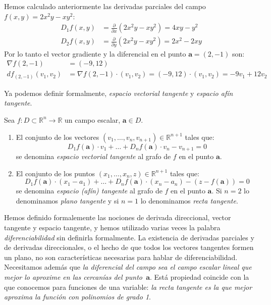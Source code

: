 \begin{ejemplo}
Hemos calculado anteriormente las derivadas parciales del campo 
$f(x,y)=2x^2y-xy^2$:
\begin{align*}
D_1f(x,y)&=\frac{\partial}{\partial x} (2x^2y-xy^2) = 4xy-y^2\\
D_2f(x,y)&=\frac{\partial}{\partial y} (2x^2y-xy^2) = 2x^2-2xy
\end{align*}
Por lo tanto el vector gradiente y la diferencial en el punto $\boldsymbol a=(2,-1)$ son:
\begin{align*}
\nabla f(2,-1)&=(-9,12)\\
df_{(2,-1)}(v_1,v_2)&=\nabla f(2,-1)\cdot(v_1,v_2)=(-9,12)\cdot(v_1,v_2)=
-9v_1+12v_2\tag*{\fej}
\end{align*}
\end{ejemplo}

Ya podemos definir formalmente, \emph{espacio vectorial tangente} y  \emph{espacio afín tangente}.
%
\begin{definicion}\label{def:tang}
Sea $f\colon \mathit{D}\subset \mathbb{R}^n\to \mathbb{R}$ un campo escalar, $\boldsymbol a\in \mathit{D}$.
\begin{enumerate}
\item
El conjunto de los vectores $(v_1,\dots,v_n,v_{n+1})\in\mathbb{R}^{n+1}$ tales que:
\[
D_1f(\boldsymbol a)\cdot v_1 +\dots+D_nf(\boldsymbol a)\cdot v_n-v_{n+1}=0
\]
se denomina \emph{espacio vectorial tangente} al grafo de $f$ en el punto $\boldsymbol a$.
\item
El conjunto de los puntos $(x_1,\dots,x_n,z)\in\mathbb{R}^{n+1}$ tales que:
\[
D_1f(\boldsymbol a)\cdot(x_1-a_1)+\dots+D_nf(\boldsymbol a)\cdot(x_n-a_n)-(z-f(\boldsymbol a))=0
\]
se denomina \emph{espacio (afín) tangente} al grafo de $f$ en el punto $\boldsymbol a$.
Si $n=2$ lo denominamos \emph{plano tangente} y si $n=1$ lo denominamos \emph{recta tangente}.
\end{enumerate}
\end{definicion}

Hemos definido formalemente las nociones de derivada direccional, vector tangente y espacio tangente, y hemos utilizado varias veces la palabra \emph{diferenciabilidad} sin definirla formalmente. 
La existencia de derivadas parciales y de derivadas direccionales, o el hecho de que todos los vectores tangentes formen un plano, no son características necesarias para hablar de diferenciabilidad.
Necesitamos además que \emph{la diferencial del campo sea el campo escalar lineal que mejor lo aproxime en las cercanías del punto~$\boldsymbol a$}.
Está propiedad coincide con la que conocemos para funciones de una variable: \emph{la recta tangente es la que mejor aproxima la función con polinomios de grado 1}.

